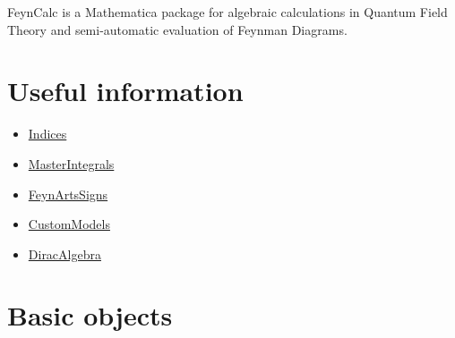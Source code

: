 \documentclass[../FeynCalcManual.tex]{subfiles}
\begin{document}
FeynCalc is a Mathematica package for algebraic calculations in Quantum
Field Theory and semi-automatic evaluation of Feynman Diagrams.

\hypertarget{useful information}{
\section{Useful information}\label{useful information}}

\begin{itemize}
\tightlist
\item
  \hyperlink{indices}{Indices}
\item
  \hyperlink{masterintegrals}{MasterIntegrals}
\item
  \hyperlink{feynartssigns}{FeynArtsSigns}
\item
  \hyperlink{custommodels}{CustomModels}
\item
  \hyperlink{diracalgebra}{DiracAlgebra}
\end{itemize}

\hypertarget{basic objects}{
\section{Basic objects}\label{basic objects}}
\end{document}
